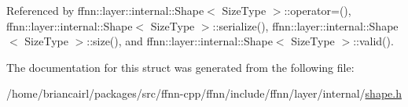 Referenced by ffnn\-::layer\-::internal\-::\-Shape$<$ Size\-Type $>$\-::operator=(), ffnn\-::layer\-::internal\-::\-Shape$<$ Size\-Type $>$\-::serialize(), ffnn\-::layer\-::internal\-::\-Shape$<$ Size\-Type $>$\-::size(), and ffnn\-::layer\-::internal\-::\-Shape$<$ Size\-Type $>$\-::valid().



The documentation for this struct was generated from the following file\-:\begin{DoxyCompactItemize}
\item 
/home/briancairl/packages/src/ffnn-\/cpp/ffnn/include/ffnn/layer/internal/\hyperlink{shape_8h}{shape.\-h}\end{DoxyCompactItemize}
